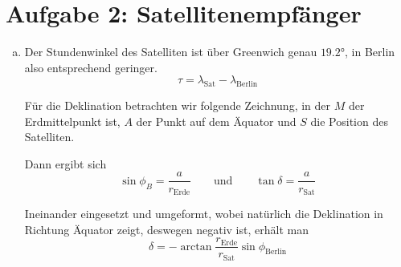 \documentclass[a4paper,german,12pt,smallheadings]{scrartcl}
\begin{document}
\section*{Aufgabe 2: Satellitenempfänger}
\begin{enumerate}[a)]
  \item
    Der Stundenwinkel des Satelliten ist über Greenwich genau $\ang{19.2}$, in
    Berlin also entsprechend geringer.
    \begin{equation}
      \tau = \lambda_\text{Sat} - \lambda_\text{Berlin}
    \end{equation}

    Für die Deklination betrachten wir folgende Zeichnung, in der $M$ der
    Erdmittelpunkt ist, $A$ der Punkt auf dem Äquator und $S$ die Position des
    Satelliten.
    \vspace{0.4cm}


    Dann ergibt sich
    \begin{equation}
      \sin \phi_B = \frac{a}{r_\text{Erde}} \qquad \text{und} \qquad
      \tan \delta = \frac{a}{r_\text{Sat}}
    \end{equation}

    Ineinander eingesetzt und umgeformt, wobei natürlich die Deklination in
    Richtung Äquator zeigt, deswegen negativ ist, erhält man
    \begin{equation}
      \delta = - \arctan \frac{r_\text{Erde}}{r_\text{Sat}} \sin \phi_\text{Berlin}
    \end{equation}


\end{enumerate}
\end{document}
